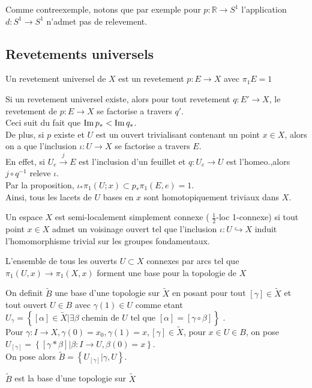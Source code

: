 \documentclass[../main.tex]{subfiles}
\begin{document}
\begin{exemple}
Comme contreexemple, notons que par exemple pour $p: \mathbb{R}\to S^{1}$ l'application $d: S^{1}\to S^{1}$ n'admet pas de relevement.
\end{exemple}
\subsection{Revetements universels}
\begin{defn}
	Un revetement universel de $X$ est un revetement $p: E\to X$ avec $\pi_1E =1$ 
\end{defn}
\begin{rmq}
Si un revetement universel existe, alors pour tout revetement $q: E'\to X$, le revetement de $p: E\to X$ se factorise a travers $q'$.\\
Ceci suit du fait que $\operatorname{Im} p_\ast < \operatorname{Im} q_\ast$.\\
De plus, si $p$ existe et $U$ est un ouvert trivialisant contenant un point $x\in X$, alors on a que l'inclusion $\iota: U\to X$ se factorise a travers $E$.\\
En effet, si $U_e\xrightarrow{j} E$ est l'inclusion d'un feuillet et $q: U_e \to U$ est l'homeo.,alors $j\circ q^{-1}$ releve $\iota$.\\
Par la proposition, $\iota_\ast \pi_1( U;x) \subset p_\ast \pi_1 ( E,e) =1$.\\
Ainsi, tous les lacets de $U$ bases en $x$ sont homotopiquement triviaux dans $X$.	
\end{rmq}
\begin{defn}
	Un espace $X$ est semi-localement simplement connexe ( $\frac{1}{2}$-loc 1-connexe) si tout point $x\in X$ admet un voisinage ouvert tel que l'inclusion $\iota : U \hookrightarrow X$ induit l'homomorphisme trivial sur les groupes fondamentaux.
\end{defn}
\begin{lemma}
L'ensemble de tous les ouverts $U \subset X$ connexes par arcs tel que $\pi_1 ( U,x) \to \pi_1( X,x) $ forment une base pour la topologie de $X$ 	
\end{lemma}
On definit $\tilde B$ une base d'une topologie sur $\tilde X$ en posant pour tout $[\gamma]\in \tilde X$ et tout ouvert $U\in B$ avec $\gamma( 1) \in U$ comme etant $U_\gamma= \left\{ [ \alpha] \in \tilde X| \exists\beta \text{ chemin de $U$ tel que } [ \alpha] = [ \gamma\circ\beta] \right\} $ .\\
Pour $\gamma:I\to X, \gamma( 0) = x_0,\gamma( 1) = x, [ \gamma] \in \tilde X$, pour $x\in U \in B$, on pose $U_{[\gamma]} = \left\{ [ \gamma\ast\beta] |\beta:I\to U, \beta( 0) = x \right\} $.\\
On pose alors $ \tilde B = \left\{ U_{ [ \gamma] } |\gamma, U \right\} $.
\begin{lemma}
$\tilde B$ est la base d'une topologie sur $\tilde X$ 
\end{lemma}
\end{document}
